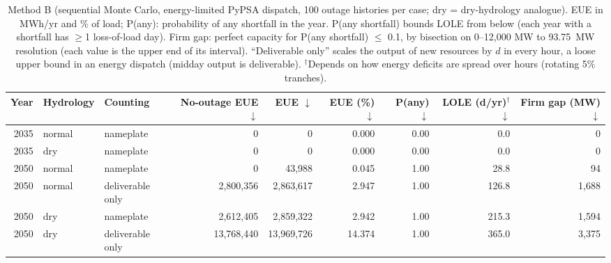 \begin{table}[!htbp]
\centering
\scriptsize
\caption{Method B (sequential Monte Carlo, energy-limited PyPSA dispatch, 100 outage histories per case; dry = dry-hydrology analogue). EUE in MWh/yr and \% of load; P(any): probability of any shortfall in the year. P(any shortfall) bounds LOLE from below (each year with a shortfall has $\ge$1 loss-of-load day). Firm gap: perfect capacity for P(any shortfall) $\le$ 0.1, by bisection on 0--12,000 MW to 93.75~MW resolution (each value is the upper end of its interval). \enquote{Deliverable only} scales the output of new resources by $d$ in every hour, a loose upper bound in an energy dispatch (midday output is deliverable). $^\dagger$Depends on how energy deficits are spread over hours (rotating 5\% tranches).}
\label{tab:smc}
\begin{adjustbox}{max width=\linewidth}
\begin{tabular}{rllrrrrrr}
\toprule
Year & Hydrology & Counting & No-outage EUE $\downarrow$ & EUE $\downarrow$ & EUE (\%) $\downarrow$ & P(any) $\downarrow$ & LOLE (d/yr)$^\dagger$ $\downarrow$ & Firm gap (MW) $\downarrow$ \\
\midrule
2035 & normal & nameplate & 0 & 0 & 0.000 & 0.00 & 0.0 & 0 \\
2035 & dry & nameplate & 0 & 0 & 0.000 & 0.00 & 0.0 & 0 \\
2050 & normal & nameplate & 0 & 43,988 & 0.045 & 1.00 & 28.8 & 94 \\
2050 & normal & deliverable only & 2,800,356 & 2,863,617 & 2.947 & 1.00 & 126.8 & 1,688 \\
2050 & dry & nameplate & 2,612,405 & 2,859,322 & 2.942 & 1.00 & 215.3 & 1,594 \\
2050 & dry & deliverable only & 13,768,440 & 13,969,726 & 14.374 & 1.00 & 365.0 & 3,375 \\
\bottomrule
\end{tabular}
\end{adjustbox}
\end{table}
